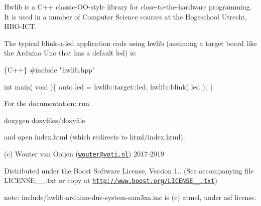 Hwlib is a C++ classic-\/\+O\+O-\/style library for close-\/to-\/the-\/hardware programming. It is used in a number of Computer Science courses at the Hogeschool Utrecht, H\+B\+O-\/\+I\+CT.

The typical blink-\/a-\/led application code using hwlib (assuming a target board like the Arduino Uno that has a default led) is\+:


\begin{DoxyCode}
\{C++\}
#include "hwlib.hpp"

int main( void )\{   
   auto led = hwlib::target::led;
   hwlib::blink( led );
\}
\end{DoxyCode}


For the documentation\+: run 
\begin{DoxyCode}
doxygen doxyfiles/doxyfile
\end{DoxyCode}
 and open index.\+html (which redirects to html/index.\+html). 



(c) Wouter van Ooijen (\href{mailto:wouter@voti.nl}{\tt wouter@voti.\+nl}) 2017-\/2019

Distributed under the Boost Software License, Version 1.. (See accompanying file L\+I\+C\+E\+N\+S\+E\+\_\+\_.\+txt or copy at \href{http://www.boost.org/LICENSE_1_0.txt}{\tt http\+://www.\+boost.\+org/\+L\+I\+C\+E\+N\+S\+E\+\_\+\_.\+txt})

note\+: include/hwlib-\/arduino-\/due-\/system-\/sam3xa.\+inc is (c) atmel, under asf license. 